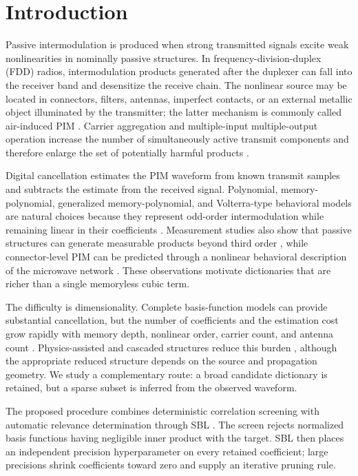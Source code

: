 \documentclass[conference]{IEEEtran}
\begin{document}
\section{Introduction}
\label{sec:intro}
Passive intermodulation is produced when strong transmitted signals excite weak nonlinearities in nominally passive structures. In frequency-division-duplex (FDD) radios, intermodulation products generated after the duplexer can fall into the receiver band and desensitize the receive chain. The nonlinear source may be located in connectors, filters, antennas, imperfect contacts, or an external metallic object illuminated by the transmitter; the latter mechanism is commonly called air-induced PIM \cite{Lui1990PIM,Lampu2021AirInduced,Lampu2023Algorithms}. Carrier aggregation and multiple-input multiple-output operation increase the number of simultaneously active transmit components and therefore enlarge the set of potentially harmful products \cite{Ahmmed2023Overview}.

Digital cancellation estimates the PIM waveform from known transmit samples and subtracts the estimate from the received signal. Polynomial, memory-polynomial, generalized memory-polynomial, and Volterra-type behavioral models are natural choices because they represent odd-order intermodulation while remaining linear in their coefficients \cite{Schetzen1980Volterra,Morgan2006GMP,Waheed2020PIM}. Measurement studies also show that passive structures can generate measurable products beyond third order \cite{Christianson2008HigherOrder}, while connector-level PIM can be predicted through a nonlinear behavioral description of the microwave network \cite{Henrie2008Prediction}. These observations motivate dictionaries that are richer than a single memoryless cubic term.

The difficulty is dimensionality. Complete basis-function models can provide substantial cancellation, but the number of coefficients and the estimation cost grow rapidly with memory depth, nonlinear order, carrier count, and antenna count \cite{Lampu2021AirInduced,Lampu2023Algorithms}. Physics-assisted and cascaded structures reduce this burden \cite{Lampu2023Cascade}, although the appropriate reduced structure depends on the source and propagation geometry. We study a complementary route: a broad candidate dictionary is retained, but a sparse subset is inferred from the observed waveform.

The proposed procedure combines deterministic correlation screening with automatic relevance determination through SBL \cite{Tipping2001SBL,Wipf2004SBL}. The screen rejects normalized basis functions having negligible inner product with the target. SBL then places an independent precision hyperparameter on every retained coefficient; large precisions shrink coefficients toward zero and supply an iterative pruning rule.
\end{document}
